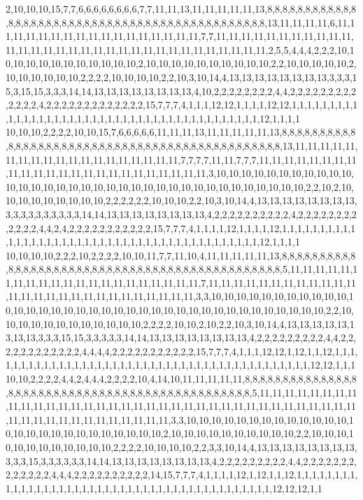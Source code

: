 2,10,10,10,15,7,7,6,6,6,6,6,6,6,6,7,7,11,11,13,11,11,11,11,11,13,8,8,8,8,8,8,8,8,8,8,8,8,8,8,8,8,8,8,8,8,8,8,8,8,8,8,8,8,8,8,8,8,8,8,8,8,8,8,8,8,8,8,8,8,8,8,13,11,11,11,11,6,11,11,11,11,11,11,11,11,11,11,11,11,11,11,11,11,11,7,7,11,11,11,11,11,11,11,11,11,11,11,11,11,11,11,11,11,11,11,11,11,11,11,11,11,11,11,11,11,11,11,11,2,5,5,4,4,4,2,2,2,10,10,10,10,10,10,10,10,10,10,10,10,2,10,10,10,10,10,10,10,10,10,10,2,2,10,10,10,10,10,2,10,10,10,10,10,10,2,2,2,2,10,10,10,10,2,2,10,3,10,14,4,13,13,13,13,13,13,13,13,3,3,3,15,3,15,15,3,3,3,14,14,13,13,13,13,13,13,13,13,4,10,2,2,2,2,2,2,2,2,4,4,2,2,2,2,2,2,2,2,2,2,2,2,2,4,2,2,2,2,2,2,2,2,2,2,2,2,2,15,7,7,7,4,1,1,1,12,12,1,1,1,1,12,12,1,1,1,1,1,1,1,1,1,1,1,1,1,1,1,1,1,1,1,1,1,1,1,1,1,1,1,1,1,1,1,1,1,1,1,1,1,1,1,1,1,1,12,1,1,1,1
10,10,10,2,2,2,2,10,10,15,7,6,6,6,6,6,11,11,11,13,11,11,11,11,11,13,8,8,8,8,8,8,8,8,8,8,8,8,8,8,8,8,8,8,8,8,8,8,8,8,8,8,8,8,8,8,8,8,8,8,8,8,8,8,8,8,8,8,8,8,8,8,13,11,11,11,11,11,11,11,11,11,11,11,11,11,11,11,11,11,11,11,7,7,7,7,11,11,7,7,7,11,11,11,11,11,11,11,11,11,11,11,11,11,11,11,11,11,11,11,11,11,11,11,11,3,10,10,10,10,10,10,10,10,10,10,10,10,10,10,10,10,10,10,10,10,10,10,10,10,10,10,10,10,10,10,10,10,10,10,10,2,2,10,2,10,10,10,10,10,10,10,10,10,2,2,2,2,2,2,10,10,10,2,2,10,3,10,14,4,13,13,13,13,13,13,13,13,3,3,3,3,3,3,3,3,3,3,14,14,13,13,13,13,13,13,13,13,4,2,2,2,2,2,2,2,2,2,2,4,2,2,2,2,2,2,2,2,2,2,2,2,4,4,2,4,2,2,2,2,2,2,2,2,2,2,2,15,7,7,7,4,1,1,1,1,12,1,1,1,1,12,1,1,1,1,1,1,1,1,1,1,1,1,1,1,1,1,1,1,1,1,1,1,1,1,1,1,1,1,1,1,1,1,1,1,1,1,1,1,1,1,1,1,1,12,1,1,1,1
10,10,10,10,2,2,2,10,2,2,2,2,10,10,11,7,7,11,10,4,11,11,11,11,11,13,8,8,8,8,8,8,8,8,8,8,8,8,8,8,8,8,8,8,8,8,8,8,8,8,8,8,8,8,8,8,8,8,8,8,8,8,8,8,8,8,8,8,8,8,8,8,5,11,11,11,11,11,11,11,11,11,11,11,11,11,11,11,11,11,11,11,11,11,7,11,11,11,11,11,11,11,11,11,11,11,11,11,11,11,11,11,11,11,11,11,11,11,11,11,11,11,3,3,10,10,10,10,10,10,10,10,10,10,10,10,10,10,10,10,10,10,10,10,10,10,10,10,10,10,10,10,10,10,10,10,10,10,10,10,10,2,2,10,10,10,10,10,10,10,10,10,10,10,10,2,2,2,2,10,10,2,10,2,2,10,3,10,14,4,13,13,13,13,13,13,13,13,3,3,3,15,15,3,3,3,3,3,14,14,13,13,13,13,13,13,13,13,4,2,2,2,2,2,2,2,2,2,4,4,2,2,2,2,2,2,2,2,2,2,2,2,4,4,4,4,2,2,2,2,2,2,2,2,2,2,2,15,7,7,7,4,1,1,1,12,12,1,12,1,1,12,1,1,1,1,1,1,1,1,1,1,1,1,1,1,1,1,1,1,1,1,1,1,1,1,1,1,1,1,1,1,1,1,1,1,1,1,1,1,1,1,1,1,1,12,12,1,1,1
10,10,2,2,2,2,4,4,2,4,4,4,2,2,2,2,10,4,14,10,11,11,11,11,11,8,8,8,8,8,8,8,8,8,8,8,8,8,8,8,8,8,8,8,8,8,8,8,8,8,8,8,8,8,8,8,8,8,8,8,8,8,8,8,8,8,8,8,8,8,8,8,5,11,11,11,11,11,11,11,11,11,11,11,11,11,11,11,11,11,11,11,11,11,11,11,11,11,11,11,11,11,11,11,11,11,11,11,11,11,11,11,11,11,11,11,11,11,11,11,11,11,3,3,10,10,10,10,10,10,10,10,10,10,10,10,10,10,10,10,10,10,10,10,10,10,10,10,10,10,2,10,10,10,10,10,10,10,10,10,10,2,2,10,10,10,10,10,10,10,10,10,10,10,10,2,2,2,2,10,10,10,10,2,2,3,3,10,14,4,13,13,13,13,13,13,13,13,3,3,3,15,3,3,3,3,3,3,14,14,13,13,13,13,13,13,13,13,4,2,2,2,2,2,2,2,2,2,4,4,2,2,2,2,2,2,2,2,2,2,2,2,2,4,4,4,2,2,2,2,2,2,2,2,2,2,14,15,7,7,7,4,1,1,1,1,12,1,12,1,1,12,1,1,1,1,1,1,1,1,1,1,1,1,1,1,1,1,1,1,1,1,1,1,1,1,1,1,1,1,1,1,1,1,1,1,1,1,1,1,1,1,1,1,1,12,12,12,1,1
